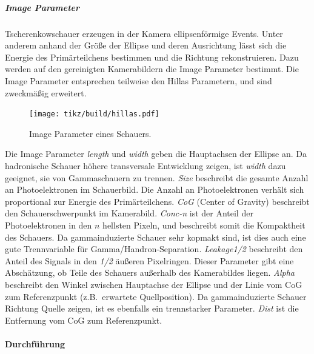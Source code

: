 \subparagraph{Image Parameter}%
\label{spar:image_parameter}

Tscherenkowschauer erzeugen in der Kamera ellipsenförmige Events.
Unter anderem anhand der Größe der Ellipse und deren Ausrichtung
lässt sich die Energie des
Primärteilchens bestimmen und die Richtung rekonstruieren.
Dazu werden auf den gereinigten Kamerabildern die Image Parameter bestimmt.
Die Image Parameter entsprechen teilweise den Hillas Parametern,
und sind zweckmäßig erweitert.


\begin{figure}
  \centering
  \texttt{[image: tikz/build/hillas.pdf]}
  \caption{Image Parameter eines Schauers.}%
  \label{fig:hillas}
\end{figure}

Die Image Parameter \textit{length} und \textit{width} geben die Hauptachsen
der Ellipse an.
Da hadronische Schauer höhere transversale Entwicklung zeigen, ist
\textit{width} dazu geeignet, sie von Gammaschauern zu trennen.
\textit{Size} beschreibt die gesamte Anzahl an Photoelektronen im Schauerbild.
Die Anzahl an Photoelektronen verhält sich proportional zur Energie des
Primärteilchens.
\textit{CoG} (Center of Gravity) beschreibt den Schauerschwerpunkt im Kamerabild.
\textit{Conc-n} ist der Anteil der Photoelektronen in den $n$ hellsten Pixeln,
und beschreibt somit die Kompaktheit des Schauers.
Da gammainduzierte Schauer sehr kopmakt sind, ist dies auch eine gute
Trennvariable für Gamma/Handron-Separation.
\textit{Leakage1/2} beschreibt den Anteil des Signals in den \textit{1/2} äußeren
Pixelringen.
Dieser Parameter gibt eine Abschätzung,
ob Teile des Schauers außerhalb des Kamerabildes liegen.
\textit{Alpha} beschreibt den Winkel zwischen Hauptachse der Ellipse und
der Linie vom CoG zum Referenzpunkt (z.B.\ erwartete Quellposition).
Da gammainduzierte Schauer Richtung Quelle zeigen,
ist es ebenfalls ein trennstarker Parameter.
\textit{Dist} ist die Entfernung vom CoG zum Referenzpunkt.


\paragraph{Durchführung}
